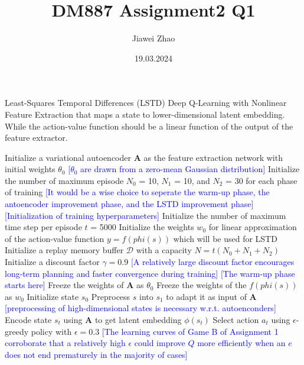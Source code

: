 \documentclass[a4paper,12pt,oneside]{article}
\numberwithin{equation}{section}
\begin{document}
\title{DM887 Assignment2 Q1}
\author{Jiawei Zhao}
\date{19.03.2024}
\maketitle
\newcommand{\mycomment}[1]{{\fontfamily{lmss}\selectfont\textcolor{blue}{[#1]}}} %
    \begin{algorithm}
    \caption {Least-Squares Temporal Differences (LSTD) Deep Q-Learning with Nonlinear Feature Extraction that maps a state to lower-dimensional latent embedding. While the action-value function should be a linear function of the output of the feature extractor.}
        \begin{algorithmic}[1]
        \State Initialize a variational autoencoder $\mathbf{A}$ as the feature extraction network with initial weights $\theta_0$ 
        \mycomment {$\theta_0$ are drawn from a zero-mean Gaussian distribution}
        \State Initialize the number of maximum episode \(N_0\) = 10, \(N_1\) = 10, and \(N_2\) = 30 for each phase of training
        \mycomment {It would be a wise choice to seperate the warm-up phase, the antoencoder improvement phase, and the LSTD improvement phase}
        \mycomment {Initialization of training hyperparameters}
        \State Initialize the number of maximum time step per episode \(t\) = 5000
        \State Initialize the weights \(w_0\) for linear approximation of the action-value function \(y = f(phi(s))\) which will be used for LSTD
        \State Initialize a replay memory buffer $\mathcal{D}$ with a capacity \(N = t (N_0 + N_1 + N_2)\)
        \State Initialize a discount factor $\gamma=0.9$ 
        \mycomment{A relatively large discount factor encourages long-term planning and faster convergence during training}
        \clearpage
        \mycomment {The warm-up phase starts here}
        \State Freeze the weights of $\mathbf{A}$ as $\theta_0$
        \State Freeze the weights of the \(f(phi(s))\) as \(w_0\)
            \State Initialize state \(s_0\) 
            \State Preprocess \(s\) into \(s_1\) to adapt it as input of $\mathbf{A}$
            \mycomment{preprocessing of high-dimensional states is necessary w.r.t. autoenconders}
                \State Encode state \(s_t\) using $\mathbf{A}$ to get latent embedding $\phi(s_t)$
                \State Select action $a_t$ using $\epsilon$-greedy policy with $\epsilon=0.3$
                \mycomment{The learning curves of Game B of Assignment 1 corroborate that a relatively high $\epsilon$ could improve \(Q\) more efficiently when an \(e\) does not end prematurely in the majority of cases}

\end{algorithmic}
\end{algorithm}
\end{document}
